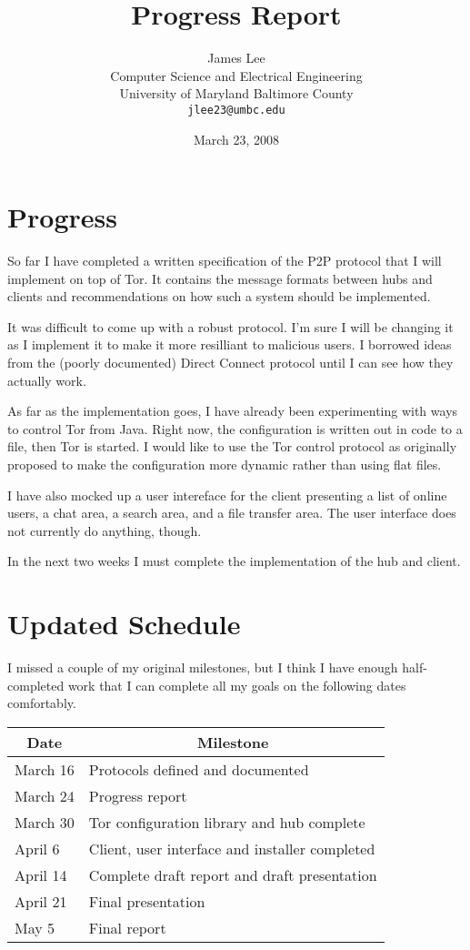 \documentclass{article}
\title{Progress Report}
\author{James Lee\\
	\small Computer Science and Electrical Engineering\\
	\small University of Maryland Baltimore County\\
	\small\tt jlee23@umbc.edu}
\date{March 23, 2008}
\begin{document}
\maketitle

\section*{Progress}
So far I have completed a written specification of the P2P protocol that I will implement on top of Tor.  It contains the message formats between hubs and clients and recommendations on how such a system should be implemented.

It was difficult to come up with a robust protocol.  I'm sure I will be changing it as I implement it to make it more resilliant to malicious users.  I borrowed ideas from the (poorly documented) Direct Connect protocol until I can see how they actually work.

As far as the implementation goes, I have already been experimenting with ways to control Tor from Java.  Right now, the configuration is written out in code to a file, then Tor is started.  I would like to use the Tor control protocol as originally proposed to make the configuration more dynamic rather than using flat files.

I have also mocked up a user intereface for the client presenting a list of online users, a chat area, a search area, and a file transfer area.  The user interface does not currently do anything, though.

In the next two weeks I must complete the implementation of the hub and client.

\section*{Updated Schedule}
I missed a couple of my original milestones, but I think I have enough half-completed work that I can complete all my goals on the following dates comfortably.

\begin{center}
\begin{tabular}{ll}
\multicolumn{1}{c}{\bf Date} & \multicolumn{1}{c}{\bf Milestone}\\
\hline
March 16 & Protocols defined and documented\\
March 24 & Progress report\\
March 30 & Tor configuration library and hub complete\\
April 6 & Client, user interface and installer completed\\
April 14 & Complete draft report and draft presentation\\
April 21 & Final presentation\\
May 5 & Final report
\end{tabular}
\end{center}
\end{document}
